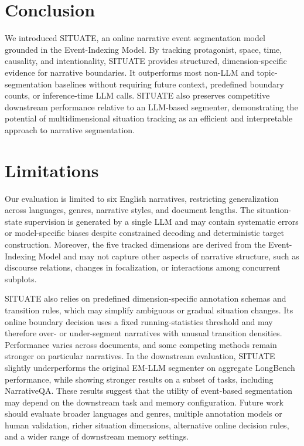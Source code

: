 \documentclass[11pt]{article}
\begin{document}
\section{Conclusion}
We introduced SITUATE, an online narrative event segmentation model grounded in the Event-Indexing Model. By tracking protagonist, space, time, causality, and intentionality, SITUATE provides structured, dimension-specific evidence for narrative boundaries. It outperforms most non-LLM and topic-segmentation baselines without requiring future context, predefined boundary counts, or inference-time LLM calls. SITUATE also preserves competitive downstream performance relative to an LLM-based segmenter, demonstrating the potential of multidimensional situation tracking as an efficient and interpretable approach to narrative segmentation.

\section*{Limitations}
Our evaluation is limited to six English narratives, restricting generalization across languages, genres, narrative styles, and document lengths. The situation-state supervision is generated by a single LLM and may contain systematic errors or model-specific biases despite constrained decoding and deterministic target construction. Moreover, the five tracked dimensions are derived from the Event-Indexing Model and may not capture other aspects of narrative structure, such as discourse relations, changes in focalization, or interactions among concurrent subplots.

SITUATE also relies on predefined dimension-specific annotation schemas and transition rules, which may simplify ambiguous or gradual situation changes. Its online boundary decision uses a fixed running-statistics threshold and may therefore over- or under-segment narratives with unusual transition densities. Performance varies across documents, and some competing methods remain stronger on particular narratives. In the downstream evaluation, SITUATE slightly underperforms the original EM-LLM segmenter on aggregate LongBench performance, while showing stronger results on a subset of tasks, including NarrativeQA. These results suggest that the utility of event-based segmentation may depend on the downstream task and memory configuration. Future work should evaluate broader languages and genres, multiple annotation models or human validation, richer situation dimensions, alternative online decision rules, and a wider range of downstream memory settings.
\end{document}
